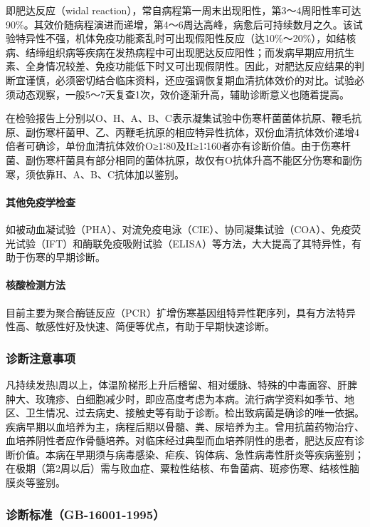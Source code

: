 即肥达反应（widal
reaction），常自病程第一周末出现阳性，第3～4周阳性率可达90\%。其效价随病程演进而递增，第4～6周达高峰，病愈后可持续数月之久。该试验特异性不强，机体免疫功能紊乱时可出现假阳性反应（达10\%～20\%），如结核病、结缔组织病等疾病在发热病程中可出现肥达反应阳性；而发病早期应用抗生素、全身情况较差、免疫功能低下时又可出现假阴性。因此，对肥达反应结果的判断宜谨慎，必须密切结合临床资料，还应强调恢复期血清抗体效价的对比。试验必须动态观察，一般5～7天复查1次，效价逐渐升高，辅助诊断意义也随着提高。

在检验报告上分别以O、H、A、B、C表示凝集试验中伤寒杆菌菌体抗原、鞭毛抗原、副伤寒杆菌甲、乙、丙鞭毛抗原的相应特异性抗体，双份血清抗体效价递增4倍者可确诊，单份血清抗体效价O≥1∶80及H≥1∶160者亦有诊断价值。由于伤寒杆菌、副伤寒杆菌具有部分相同的菌体抗原，故仅有O抗体升高不能区分伤寒和副伤寒，须依靠H、A、B、C抗体加以鉴别。

\paragraph{其他免疫学检查}

如被动血凝试验（PHA）、对流免疫电泳（CIE）、协同凝集试验（COA）、免疫荧光试验（IFT）和酶联免疫吸附试验（ELISA）等方法，大大提高了其特异性，有助于伤寒的早期诊断。

\paragraph{核酸检测方法}

目前主要为聚合酶链反应（PCR）扩增伤寒基因组特异性靶序列，具有方法特异性高、敏感性好及快速、简便等优点，有助于早期快速诊断。

\subsubsection{诊断注意事项}

凡持续发热l周以上，体温阶梯形上升后稽留、相对缓脉、特殊的中毒面容、肝脾肿大、玫瑰疹、白细胞减少时，即应高度考虑为本病。流行病学资料如季节、地区、卫生情况、过去病史、接触史等有助于诊断。检出致病菌是确诊的唯一依据。疾病早期以血培养为主，病程后期以骨髓、粪、尿培养为主。曾用抗菌药物治疗、血培养阴性者应作骨髓培养。对临床经过典型而血培养阴性的患者，肥达反应有诊断价值。本病在早期须与病毒感染、疟疾、钩体病、急性病毒性肝炎等疾病鉴别；在极期（第2周以后）需与败血症、粟粒性结核、布鲁菌病、斑疹伤寒、结核性脑膜炎等鉴别。

\subsubsection{诊断标准（GB-16001-1995）}

